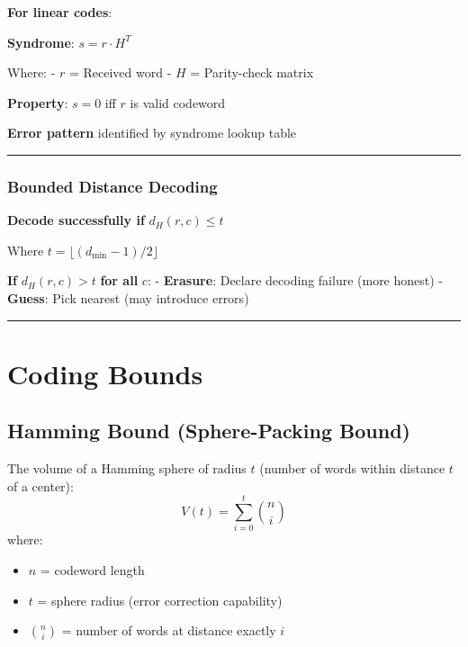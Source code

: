 \textbf{For linear codes}:

\textbf{Syndrome}: \(s = r \cdot H^T\)

Where: - \(r\) = Received word - \(H\) = Parity-check matrix

\textbf{Property}: \(s = 0\) iff \(r\) is valid codeword

\textbf{Error pattern} identified by syndrome lookup table

\begin{center}\rule{0.5\linewidth}{0.5pt}\end{center}

\subsubsection{Bounded Distance
Decoding}\label{bounded-distance-decoding}

\textbf{Decode successfully if} \(d_H(r, c) \leq t\)

Where \(t = \lfloor (d_{\min} - 1)/2 \rfloor\)

\textbf{If} \(d_H(r, c) > t\) \textbf{for all} \(c\): -
\textbf{Erasure}: Declare decoding failure (more honest) -
\textbf{Guess}: Pick nearest (may introduce errors)

\begin{center}\rule{0.5\linewidth}{0.5pt}\end{center}

\section{Coding Bounds}

\subsection{Hamming Bound (Sphere-Packing Bound)}

The volume of a Hamming sphere of radius $t$ (number of words within distance $t$ of a center):
\begin{equation}
V(t) = \sum_{i=0}^{t} \binom{n}{i}
\label{eq:sphere-volume}
\end{equation}
where:
\begin{itemize}
\item $n$ = codeword length
\item $t$ = sphere radius (error correction capability)
\item $\binom{n}{i}$ = number of words at distance exactly $i$
\end{itemize}

